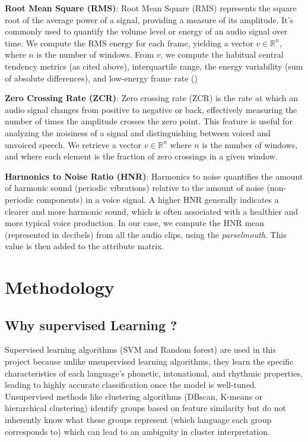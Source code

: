 \documentclass[twocolumn]{article}
\newcommand{\R}{\mathbb{R}}
\begin{document}
\textbf{Root Mean Square (RMS)}: Root Mean Square (RMS) represents the square root of the average power of a signal, providing a measure of its amplitude. It's commonly used to quantify the volume level or energy of an audio signal over time. We compute the RMS energy for each frame, yielding a vector $v \in \R^{n}$, where $n$ is the number of windows. From $v$, we compute the habitual central tendency metrics (as cited above), interquartile range, the energy variability (sum of absolute differences), and low-energy frame rate ()

\textbf{Zero Crossing Rate (ZCR)}: Zero crossing rate (ZCR) is the rate at which an audio signal changes from positive to negative or back, effectively measuring the number of times the amplitude crosses the zero point. This feature is useful for analyzing the noisiness of a signal and distinguishing between voiced and unvoiced speech. We retrieve a vector $v \in \R^{n}$ where $n$ is the number of windows, and where each element is the fraction of zero crossings in a given window.

\textbf{Harmonics to Noise Ratio (HNR)}:
Harmonics to noise quantifies the amount of harmonic sound (periodic vibrations) relative to the amount of noise (non-periodic components) in a voice signal. A higher HNR generally indicates a clearer and more harmonic sound, which is often associated with a healthier and more typical voice production. In our case, we compute the HNR mean (represented in decibels) from all the audio clips, using the \textit{parselmouth}. This value is then added to the attribute matrix. 

\newpage
\section{Methodology}
\subsection{Why supervised Learning ?}
Supervised learning algorithms (SVM and Random forest) are used in this project because unlike unsupervised learning algorithms, they learn the specific characteristics of each language’s phonetic, intonational, and rhythmic properties, leading to highly accurate classification once the model is well-tuned. Unsupervised methods like clustering algorithms (DBscan, K-means or hierarchical clustering) identify groups based on feature similarity but do not inherently know what these groups represent (which language each group corresponds to) which can lead to an ambiguity in cluster interpretation.
\end{document}
